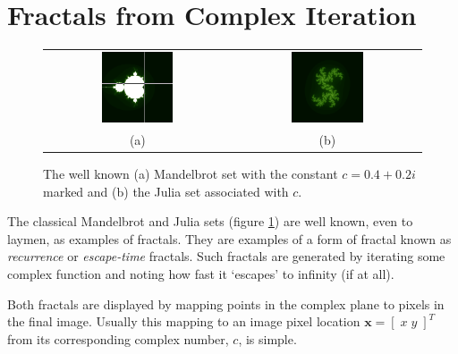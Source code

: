 \section{Fractals from Complex Iteration}

\begin{figure}
\centering
\begin{tabular}{c@{$\quad$}c}
\includegraphics[width=0.4\textwidth]{euc_mandel_julia_pos} 
 & \includegraphics[width=0.4\textwidth]{julia_euc} \\
                          (a) & (b)
\end{tabular}
\caption{\label{fig:euclidean_sets}The well known (a) Mandelbrot set with
  the constant $c = 0.4 + 0.2i$ marked and (b) the Julia
  set associated with $c$.}
\end{figure}

The classical Mandelbrot and Julia sets (figure \ref{fig:euclidean_sets}) are
well known, even to laymen, as examples of fractals. They are
examples of a form of fractal known as \emph{recurrence} or 
\emph{escape-time}
fractals.  Such fractals are generated by iterating some complex function and
noting how fast it `escapes' to infinity (if at all).

Both fractals are displayed by mapping points in the complex plane to
pixels in the final image.
Usually this mapping to an image pixel location $\mathbf{x} = [\; x\;y \;]^T$
from its corresponding complex number, $c$, is simple.


